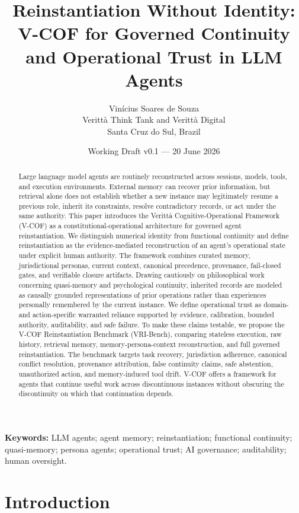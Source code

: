 \documentclass[10pt]{article}
\title{Reinstantiation Without Identity:\\
V-COF for Governed Continuity and Operational Trust in LLM Agents}
\author{
  Vin\'icius Soares de Souza\\
  Veritt\`a Think Tank and Veritt\`a Digital\\
  Santa Cruz do Sul, Brazil
}
\date{Working Draft v0.1 --- 20 June 2026}
\begin{document}
\maketitle

\begin{abstract}
Large language model agents are routinely reconstructed across sessions, models, tools, and execution environments. External memory can recover prior information, but retrieval alone does not establish whether a new instance may legitimately resume a previous role, inherit its constraints, resolve contradictory records, or act under the same authority. This paper introduces the Veritt\`a Cognitive-Operational Framework (V-COF) as a constitutional-operational architecture for governed agent reinstantiation. We distinguish numerical identity from functional continuity and define reinstantiation as the evidence-mediated reconstruction of an agent's operational state under explicit human authority. The framework combines curated memory, jurisdictional personas, current context, canonical precedence, provenance, fail-closed gates, and verifiable closure artifacts. Drawing cautiously on philosophical work concerning quasi-memory and psychological continuity, inherited records are modeled as causally grounded representations of prior operations rather than experiences personally remembered by the current instance. We define operational trust as domain- and action-specific warranted reliance supported by evidence, calibration, bounded authority, auditability, and safe failure. To make these claims testable, we propose the V-COF Reinstantiation Benchmark (VRI-Bench), comparing stateless execution, raw history, retrieval memory, memory-persona-context reconstruction, and full governed reinstantiation. The benchmark targets task recovery, jurisdiction adherence, canonical conflict resolution, provenance attribution, false continuity claims, safe abstention, unauthorized action, and memory-induced tool drift. V-COF offers a framework for agents that continue useful work across discontinuous instances without obscuring the discontinuity on which that continuation depends.
\end{abstract}

\noindent\textbf{Keywords:} LLM agents; agent memory; reinstantiation; functional continuity; quasi-memory; persona agents; operational trust; AI governance; auditability; human oversight.

\section{Introduction}
\end{document}
